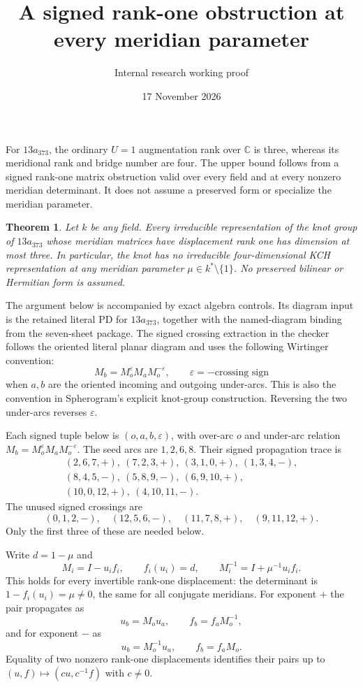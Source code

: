 \documentclass[11pt]{article}
\title{A signed rank-one obstruction at every meridian parameter}
\author{Internal research working proof}
\date{17 November 2026}
\newtheorem{theorem}{Theorem}
\begin{document}
\maketitle

For $13a_{373}$, the ordinary $U=1$ augmentation rank over $\mathbb C$
is three, whereas its meridional rank and bridge number are four.
The upper bound follows from a signed rank-one matrix obstruction valid
over every field and at every nonzero meridian determinant. It does not
assume a preserved form or specialize the meridian parameter.

\begin{theorem}\label{thm:generic}
Let $k$ be any field. Every irreducible representation of the knot group
of $13a_{373}$ whose meridian matrices have displacement rank one has
dimension at most three. In particular, the knot has no irreducible
four-dimensional KCH representation at any meridian parameter
$\mu\in k^*\setminus\{1\}$.
No preserved bilinear or Hermitian form is assumed.
\end{theorem}

The argument below is accompanied by exact algebra controls. Its diagram input is
the retained literal PD for $13a_{373}$, together with the named-diagram
binding from the seven-sheet package. The signed crossing extraction in
the checker follows the oriented literal planar diagram and uses the
following Wirtinger convention:
\[
 M_b=M_o^\varepsilon M_aM_o^{-\varepsilon},
 \qquad\varepsilon=-\text{crossing sign}
\]
when $a,b$ are the oriented incoming and outgoing under-arcs. This is
also the convention in Spherogram's explicit knot-group construction.
Reversing
the two under-arcs reverses $\varepsilon$.

Each signed tuple below is $(o,a,b,\varepsilon)$, with over-arc $o$
and under-arc relation $M_b=M_o^\varepsilon M_aM_o^{-\varepsilon}$.
The seed arcs are $1,2,6,8$. Their signed propagation trace is
\[
\begin{gathered}
(2,6,7,+),\ (7,2,3,+),\ (3,1,0,+),\ (1,3,4,-),\\
(8,4,5,-),\ (5,8,9,-),\ (6,9,10,+),\\
(10,0,12,+),\ (4,10,11,-).
\end{gathered}
\]
The unused signed crossings are
\[
 (0,1,2,-),\quad(12,5,6,-),\quad
 (11,7,8,+),\quad(9,11,12,+).
\]
Only the first three of these are needed below.

Write $d=1-\mu$ and
\[
 M_i=I-u_if_i,\qquad f_i(u_i)=d,\qquad
 M_i^{-1}=I+\mu^{-1}u_if_i.
\]
This holds for every invertible rank-one displacement: the determinant
is $1-f_i(u_i)=\mu\ne0$, the same for all conjugate meridians.
For exponent $+$ the pair propagates as
\[
 u_b=M_ou_a,\qquad f_b=f_aM_o^{-1},
\]
and for exponent $-$ as
\[
 u_b=M_o^{-1}u_a,\qquad f_b=f_aM_o.
\]
Equality of two nonzero rank-one displacements identifies their pairs
up to $(u,f)\mapsto(cu,c^{-1}f)$ with $c\ne0$.
\end{document}
